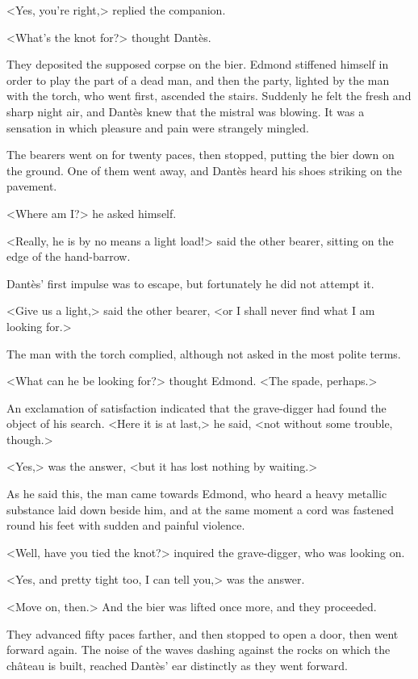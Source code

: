  <Yes, you're right,> replied the companion. 

 <What's the knot for?> thought Dantès. 

 They deposited the supposed corpse on the bier. Edmond stiffened himself in order to play the part of a dead man, and then the party, lighted by the man with the torch, who went first, ascended the stairs. Suddenly he felt the fresh and sharp night air, and Dantès knew that the mistral was blowing. It was a sensation in which pleasure and pain were strangely mingled. 

 The bearers went on for twenty paces, then stopped, putting the bier down on the ground. One of them went away, and Dantès heard his shoes striking on the pavement. 

 <Where am I?> he asked himself. 

 <Really, he is by no means a light load!> said the other bearer, sitting on the edge of the hand-barrow. 

 Dantès' first impulse was to escape, but fortunately he did not attempt it. 

 <Give us a light,> said the other bearer, <or I shall never find what I am looking for.> 

 The man with the torch complied, although not asked in the most polite terms. 

 <What can he be looking for?> thought Edmond. <The spade, perhaps.> 

 An exclamation of satisfaction indicated that the grave-digger had found the object of his search. <Here it is at last,> he said, <not without some trouble, though.> 

 <Yes,> was the answer, <but it has lost nothing by waiting.> 

 As he said this, the man came towards Edmond, who heard a heavy metallic substance laid down beside him, and at the same moment a cord was fastened round his feet with sudden and painful violence. 

 <Well, have you tied the knot?> inquired the grave-digger, who was looking on. 

 <Yes, and pretty tight too, I can tell you,> was the answer. 

 <Move on, then.> And the bier was lifted once more, and they proceeded. 

 They advanced fifty paces farther, and then stopped to open a door, then went forward again. The noise of the waves dashing against the rocks on which the château is built, reached Dantès' ear distinctly as they went forward. 

